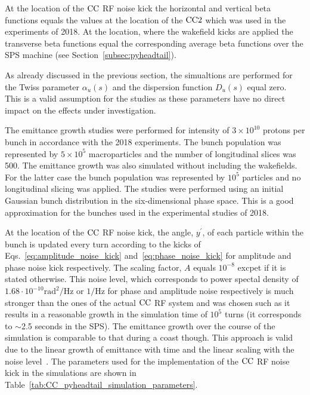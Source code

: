 At the location of the ${\mathrm{CC}}$ RF noise kick the horizontal and vertical beta functions equals the values at the location of the ${\mathrm{CC}}2$ which was used in the experiments of 2018. At the location, where the wakefield kicks are applied the transverse beta functions equal the corresponding average beta functions over the SPS machine (see Section~\ref{subsec:pyheadtail}). 

As already discussed in the previous section, the simualtions are performed for the Twiss parameter $\alpha_u(s)$ and the dispersion function $D_u(s)$ equal zero. This is a valid assumption for the studies as these parameters have no direct impact on the effects under investigation.

The emittance growth studies were performed for intensity of $3 \times 10^{10}$ protons per bunch in accordance with the 2018 experiments. The bunch population was represented by $5 \times 10^{5}$ macroparticles and the number of longitudinal slices was 500. The emittance growth was also simulated without including the wakefields. For the latter case the bunch population was represented by $10^{5}$ particles and no longitudinal slicing was applied. The studies were performed using an initial Gaussian bunch distribution in the six-dimensional phase space. This is a good approximation for the bunches used in the experimental studies of 2018. 

At the location of the ${\mathrm{CC}}$ RF noise kick, the angle, $y^\prime$, of each particle within the bunch is updated every turn according to the kicks of Eqs.~\eqref{eq:amplitude_noise_kick} and~\eqref{eq:phase_noise_kick} for amplitude and phase noise kick respectively. The scaling factor, $A$ equals $10^{-8}$ excpet if it is stated otherwise. This noise level, which corresponds to power spectal density of $1.68 \cdot 10^{-10} \mathrm{rad^2/Hz}$ or $\mathrm{1/Hz}$ for phase and amplitude noise respectively is much stronger than the ones of the actual ${\mathrm{CC}}$ RF system and was chosen such as it results in a reasonable growth in the simulation time of $10^5$ turns (it corresponds to $\sim$2.5 seconds in the SPS). The emittance growth over the course of the simulation is comparable to that during a coast though. This approach is valid due to the linear growth of emittance with time and the linear scaling with the noise level~\cite{PhysRevSTAB.18.101001}. The parameters used for the implementation of the ${\mathrm{CC}}$ RF noise kick in the simulations are shown in Table~\ref{tab:CC_pyheadtail_simulation_parameters}.

